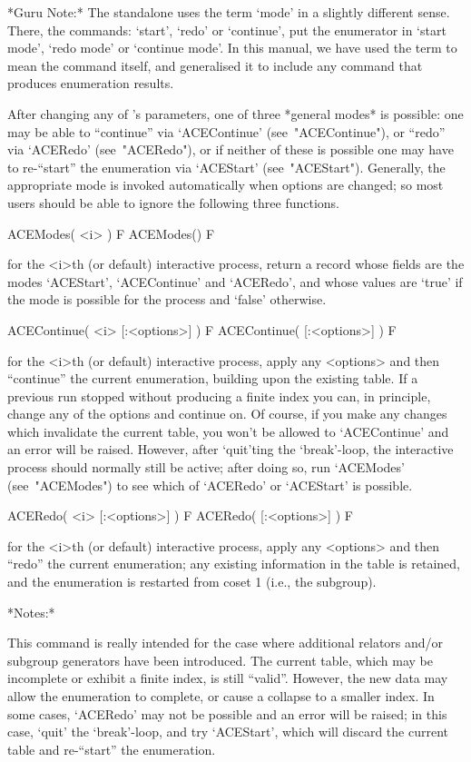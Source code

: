 *Guru Note:*
The {\ACE} standalone uses the term `mode'  in  a  slightly  different
sense. There, the commands: `start', `redo'  or  `continue',  put  the
{\ACE} enumerator in `start mode', `redo mode' or `continue mode'.  In
this manual, we have used the term to mean  the  command  itself,  and
generalised it  to  include  any  command  that  produces  enumeration
results.

After changing any of  {\ACE}'s  parameters,  one  of  three  *general
modes* is possible: one may be able to ``continue'' via  `ACEContinue'
(see~"ACEContinue"), or ``redo'' via `ACERedo' (see~"ACERedo"), or  if
neither of  these  is  possible  one  may  have  to  re-``start''  the
enumeration   via   `ACEStart'   (see~"ACEStart").   Generally,    the
appropriate mode is invoked automatically when options are changed; so
most users should be able to ignore the following three functions.

\>ACEModes( <i> ) F
\>ACEModes() F

for the <i>th (or default) interactive {\ACE} process, return a record
whose fields are the modes `ACEStart',  `ACEContinue'  and  `ACERedo',
and whose values are `true' if the mode is possible  for  the  process
and `false' otherwise.

\>ACEContinue( <i> [:<options>] ) F
\>ACEContinue( [:<options>] ) F

for the <i>th (or  default)  interactive  {\ACE}  process,  apply  any
<options> and then ``continue'' the current enumeration, building upon
the existing table. If a previous  run  stopped  without  producing  a
finite index you can, in principle, change  any  of  the  options  and
continue on. Of course, if you make any changes which  invalidate  the
current table, you won't be allowed to `ACEContinue' and an error will
be raised. However, after `quit'ting the `break'-loop, the interactive
{\ACE} process should normally still be active; after  doing  so,  run
`ACEModes' (see~"ACEModes") to see which of `ACERedo' or `ACEStart' is
possible.

\>ACERedo( <i> [:<options>] ) F
\>ACERedo( [:<options>] ) F

for the <i>th (or  default)  interactive  {\ACE}  process,  apply  any
<options> and then ``redo''  the  current  enumeration;  any  existing
information in the table is retained, and the enumeration is restarted
from coset 1 (i.e., the subgroup).

*Notes:*

This command is really intended for the case where additional relators
and/or subgroup generators have been introduced.  The  current  table,
which may be incomplete or exhibit a finite index, is still ``valid''.
However, the new data may allow the enumeration to complete, or  cause
a collapse to a smaller index. In some cases,  `ACERedo'  may  not  be
possible and an error  will  be  raised;  in  this  case,  `quit'  the
`break'-loop, and try `ACEStart', which will discard the current table
and re-``start'' the enumeration.

